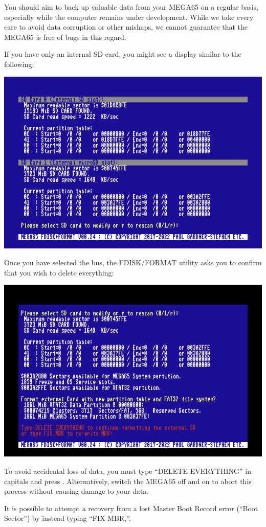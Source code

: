 You should aim to back up valuable data from your
MEGA65 on a regular basis, especially while the computer remains under
development.  While we take every care to avoid data corruption or
other mishaps, we cannot guarantee that the MEGA65 is free of bugs in
this regard.

If you have only an internal SD card, you might see a
display similar to the following:

\begin{center}
\includegraphics[width=0.7\linewidth]{images/ss-m65fdisk-busselect.png}
\end{center}

Once you have selected the bus, the FDISK/FORMAT utility asks you to confirm that you wish to delete everything:

\begin{center}
\includegraphics[width=0.7\linewidth]{images/ss-m65fdisk-typesomething.png}
\end{center}

To avoid accidental loss of data, you must type ``DELETE EVERYTHING'' in capitals and press . Alternatively, switch the MEGA65 off and on to abort this process without causing damage to your data.

It is possible to attempt a recovery from a lost Master Boot Record error (``Boot Sector'') by instead typing ``FIX MBR,''.


